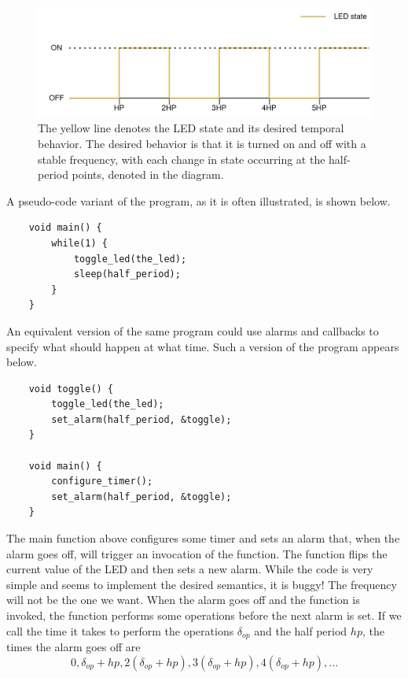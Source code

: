 \begin{figure}
    \centering
    \includegraphics[scale=0.2]{graphics/correct-frequency.png}
    \caption{The yellow line denotes the LED state and its desired temporal behavior. The desired behavior
    is that it is turned on and off with a stable frequency, with each change in state occurring at the
    half-period points, denoted  in the diagram.}
    \label{graphics:correct-frequency}
\end{figure}

A pseudo-code variant of the program, as it is often illustrated, is shown below.

\begin{verbatim}
    void main() {
        while(1) {
            toggle_led(the_led);
            sleep(half_period);
        }
    }
\end{verbatim}

An equivalent version of the same program could use alarms and callbacks to specify what should happen at what time. Such
a version of the program appears below.
\begin{verbatim}
    void toggle() {
        toggle_led(the_led);
        set_alarm(half_period, &toggle);
    }

    void main() {
        configure_timer();
        set_alarm(half_period, &toggle);
    }
\end{verbatim}

The main function above configures some timer and sets an alarm that, when the alarm goes off, will trigger an invocation of
the  function. The  function flips the current value of the LED and then sets a new alarm.
While the code is very simple and seems to implement the desired semantics, it is buggy! The frequency will not be
the one we want. When the alarm goes off and the function is invoked, the function performs some operations before the next
alarm is set. If we call the time it takes to perform the operations $\delta_{op}$ and the half period $hp$, the times the
alarm goes off are $$0, \delta_{op} + hp, 2(\delta_{op} + hp), 3(\delta_{op} + hp), 4(\delta_{op} + hp), ...$$

